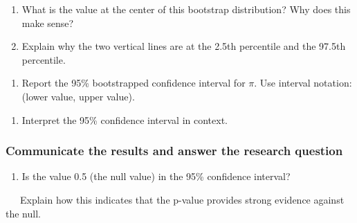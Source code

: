 \documentclass[
]{report}
\providecommand{\tightlist}{%
  \setlength{\itemsep}{0pt}\setlength{\parskip}{0pt}}
\begin{document}
\vspace{1.8in}

\begin{enumerate}
\def\labelenumi{\arabic{enumi}.}
\setcounter{enumi}{8}
\item
  What is the value at the center of this bootstrap distribution? Why does this make sense?
  \vspace{.8in}
\item
  Explain why the two vertical lines are at the 2.5th percentile and the 97.5th percentile.
\end{enumerate}

\vspace{.4in}

\begin{enumerate}
\def\labelenumi{\arabic{enumi}.}
\setcounter{enumi}{10}
\tightlist
\item
  Report the 95\% bootstrapped confidence interval for \(\pi\). Use interval notation: (lower value, upper value).
\end{enumerate}

\vspace{0.2in}

\begin{enumerate}
\def\labelenumi{\arabic{enumi}.}
\setcounter{enumi}{11}
\tightlist
\item
  Interpret the 95\% confidence interval in context.
\end{enumerate}

\vspace{.6in}

\subsubsection*{Communicate the results and answer the research question}\label{communicate-the-results-and-answer-the-research-question-1}

\begin{enumerate}
\def\labelenumi{\arabic{enumi}.}
\setcounter{enumi}{12}
\tightlist
\item
  Is the value 0.5 (the null value) in the 95\% confidence interval?
\end{enumerate}

\vspace{.2in}

~~~Explain how this indicates that the p-value provides strong evidence against the null.
\end{document}
